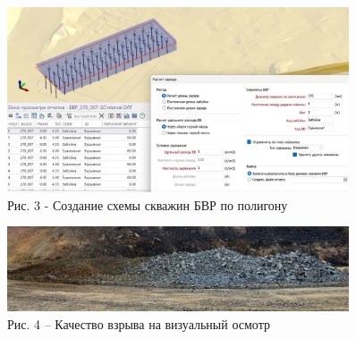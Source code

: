 \begin{figure}[H]
	\centering
	\includegraphics[width=0.9\textwidth]{media/gor/image30}
	\caption*{Рис. 3 - Создание схемы скважин БВР по полигону}
\end{figure}

\begin{figure}[H]
	\centering
	\includegraphics[width=0.9\textwidth]{media/gor/image31}
	\caption*{Рис. 4 -- Качество взрыва на визуальный осмотр}
\end{figure}


